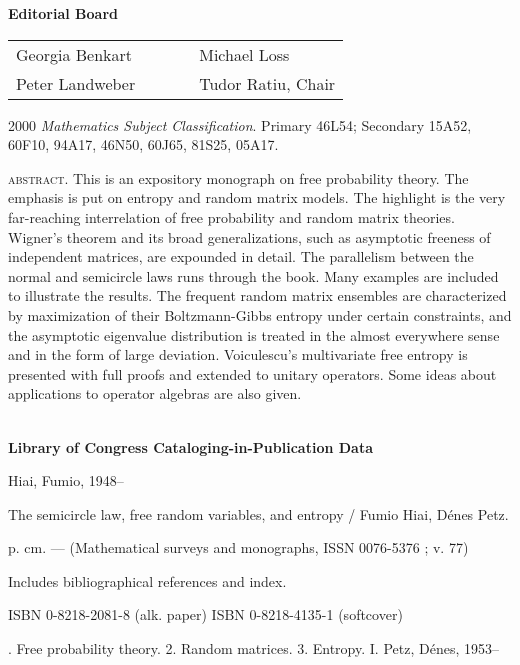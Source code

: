 \begin{copyrightpage}
\begin{center}
\textbf{Editorial Board}

\begin{tabular}{lllll}
Georgia Benkart & & & & \quad Michael Loss\\
Peter Landweber & & & & \quad Tudor Ratiu, Chair\\
\end{tabular}
\end{center}

\begin{center}
2000 \textit{Mathematics Subject Classification}. Primary 46L54;
Secondary 15A52, 60F10, 94A17, 46N50, 60J65, 81S25, 05A17.
\end{center}

\noindent \textsc{abstract}. This is an expository monograph on free
probability theory. The emphasis is put on entropy and random matrix
models. The highlight is the very far-reaching interrelation of free
probability and random matrix theories. Wigner's theorem and its
broad generalizations, such as asymptotic freeness of independent
matrices, are expounded in detail. The parallelism between the
normal and semicircle laws runs through the book. Many examples are
included to illustrate the results. The frequent random matrix
ensembles are characterized by maximization of their Boltzmann-Gibbs
entropy under certain constraints, and the asymptotic eigenvalue
distribution is treated in the almost everywhere sense and in the
form of large deviation. Voiculescu's multivariate free entropy is
presented with full proofs and extended to unitary operators. Some
ideas about applications to operator algebras are also given.

\hrulefill\\

\noindent \textbf{Library of Congress Cataloging-in-Publication
Data}

\noindent Hiai, Fumio, 1948--

\quad The semicircle law, free random variables, and entropy / Fumio
Hiai, D\'{e}nes Petz.

\qquad p. cm. --- (Mathematical surveys and monographs, ISSN
0076-5376 ; v. 77)

\quad Includes bibliographical references and index.

\quad ISBN 0-8218-2081-8 (alk. paper) \quad ISBN 0-8218-4135-1
(softcover)

. Free probability theory. 2. Random matrices. 3. Entropy. I.
Petz, D\'{e}nes, 1953--


\end{copyrightpage}
